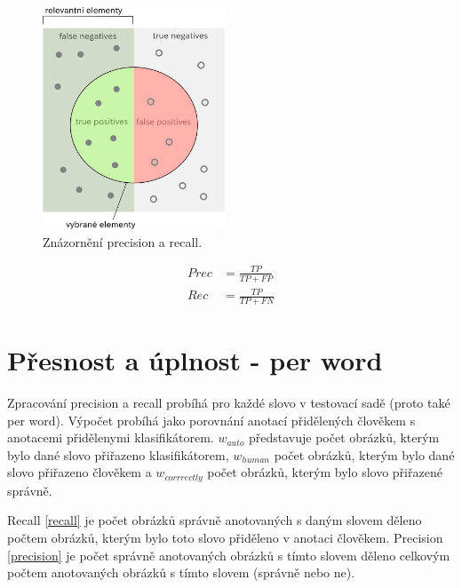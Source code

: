 \documentclass[czech,BP]{thesiskiv}
\begin{document}
\begin{multicols}{2}
	\begin{figure}[H]
		    \centering
		\includegraphics[height=250px]{./img/recall_precision.png}
		\caption{Znázornění precision a recall.}
	\end{figure}
	\begin{center}
		\begin{align}
   			\label{precision2} Prec &= \frac{TP}{TP + FP} \\[30pt]
   			\label{recall2} Rec &= \frac{TP}{TP + FN}
		\end{align}

	\end{center}
\end{multicols}

\section{Přesnost a úplnost - per word}
\par Zpracování precision a recall probíhá pro každé slovo v testovací sadě (proto také per word). Výpočet probíhá jako porovnání anotací přidělených člověkem s anotacemi přidělenymi klasifikátorem. $w_{auto}$ představuje počet obrázků, kterým bylo dané slovo přiřazeno klasifikátorem, $w_{human}$ počet obrázků, kterým bylo dané slovo přiřazeno člověkem a $w_{corrrectly}$ počet obrázků, kterým bylo slovo přiřazené správně. 

\par Recall \eqref{recall} je počet obrázků správně anotovaných s daným slovem děleno počtem obrázků, kterým bylo toto slovo přiděleno v anotaci člověkem. Precision \eqref{precision} je počet správně anotovaných obrázků s tímto slovem děleno celkovým počtem anotovaných obrázků s tímto slovem (správně nebo ne). 
\end{document}
